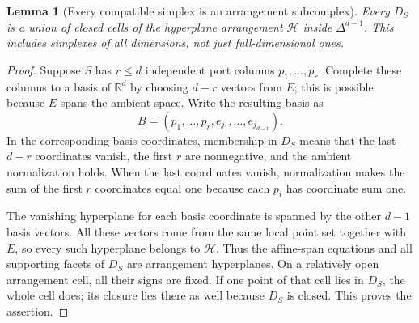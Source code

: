 \documentclass[11pt,a4paper]{article}
\newtheorem{lemma}[theorem]{Lemma}
\theoremstyle{definition}
\theoremstyle{remark}
\newcommand{\R}{\mathbb R}\newcommand{\Q}{\mathbb Q}\newcommand{\Z}{\mathbb Z}
\begin{document}
\begin{lemma}[Every compatible simplex is an arrangement subcomplex]
\label{lem:frame}
Every $D_S$ is a union of closed cells of the hyperplane arrangement $\mathcal H$ inside $\Delta^{d-1}$. This includes simplexes of all dimensions, not just full-dimensional ones.
\end{lemma}
\begin{proof}
Suppose $S$ has $r\le d$ independent port columns $p_1,\ldots,p_r$. Complete these columns to a basis of $\R^d$ by choosing $d-r$ vectors from $E$; this is possible because $E$ spans the ambient space. Write the resulting basis as
\[
 B=(p_1,\ldots,p_r,e_{j_1},\ldots,e_{j_{d-r}}).
\]
In the corresponding basis coordinates, membership in $D_S$ means that the last $d-r$ coordinates vanish, the first $r$ are nonnegative, and the ambient normalization holds. When the last coordinates vanish, normalization makes the sum of the first $r$ coordinates equal one because each $p_i$ has coordinate sum one.

The vanishing hyperplane for each basis coordinate is spanned by the other $d-1$ basis vectors. All these vectors come from the same local point set together with $E$, so every such hyperplane belongs to $\mathcal H$. Thus the affine-span equations and all supporting facets of $D_S$ are arrangement hyperplanes. On a relatively open arrangement cell, all their signs are fixed. If one point of that cell lies in $D_S$, the whole cell does; its closure lies there as well because $D_S$ is closed. This proves the assertion.
\end{proof}
\end{document}
